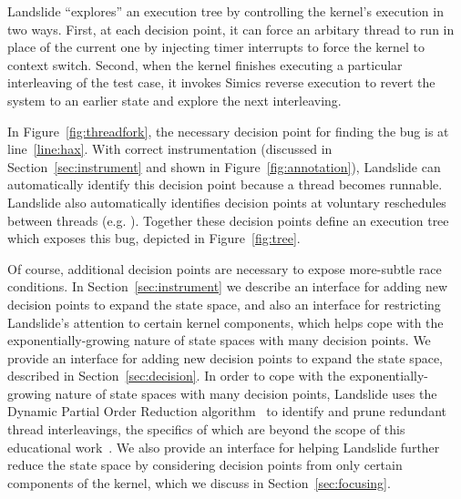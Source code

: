 Landslide ``explores'' an execution tree by controlling the kernel's execution in two ways.
First, at each decision point, it can force an arbitary thread to run in place of the current one by injecting timer interrupts to force the kernel to context switch.
Second, when the kernel finishes executing a particular interleaving of the test case, it invokes Simics reverse execution to revert the system to an earlier state and explore the next interleaving.

In Figure~\ref{fig:threadfork}, the necessary decision point for finding the bug is at line~\ref{line:hax}. With correct instrumentation (discussed in Section~\ref{sec:instrument} and shown in Figure~\ref{fig:annotation}), Landslide can automatically identify this decision point because a thread becomes runnable.
Landslide also automatically identifies decision points at voluntary reschedules between threads (e.g. ). Together these decision points define an execution tree which exposes this bug, depicted in Figure~\ref{fig:tree}.


Of course, additional decision points are necessary to expose more-subtle race conditions.
\shortversion
{In Section~\ref{sec:instrument} we describe an interface for adding new
decision points to expand the state space,
and also an interface for restricting Landslide's attention to certain kernel components,
which helps cope with the exponentially-growing nature of state spaces with many decision points.}
{We provide an interface for adding new decision points to expand the state space, described in Section~\ref{sec:decision}.
In order to cope with the exponentially-growing nature of state spaces with many decision points,
Landslide uses the Dynamic Partial Order Reduction algorithm~\cite{dpor} to identify and prune redundant thread interleavings, the specifics of which are beyond the scope of this educational work~\cite{landslide}.
We also provide an interface for helping Landslide further reduce the state space by considering
decision points from only certain components of the kernel, which we discuss in Section~\ref{sec:focusing}.}

